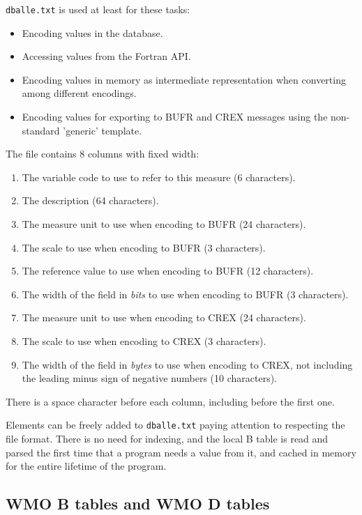 {\tt dballe.txt} is used at least for these tasks:

\begin{itemize}
\item Encoding values in the \dballe{} database.
\item Accessing values from the Fortran API\cite{FAPI}.
\item Encoding values in memory as intermediate representation when converting
      among different encodings.
\item Encoding values for exporting to BUFR and CREX messages using the
      non-standard 'generic' template.
\end{itemize}

The file contains 8 columns with fixed width:

\begin{enumerate}
\item The variable code to use to refer to this measure (6 characters).
\item The description (64 characters).
\item The measure unit to use when encoding to BUFR (24 characters).
\item The scale to use when encoding to BUFR (3 characters).
\item The reference value to use when encoding to BUFR (12 characters).
\item The width of the field in \emph{bits} to use when encoding to BUFR (3 characters).
\item The measure unit to use when encoding to CREX (24 characters).
\item The scale to use when encoding to CREX (3 characters).
\item The width of the field in \emph{bytes} to use when encoding to CREX, not
      including the leading minus sign of negative numbers (10 characters).
\end{enumerate}

There is a space character before each column, including before the first one.

Elements can be freely added to {\tt dballe.txt} paying attention to respecting
the file format.  There is no need for indexing, and the local B table is read
and parsed the first time that a program needs a value from it, and cached in
memory for the entire lifetime of the program.

\subsection{WMO B tables and WMO D tables}

